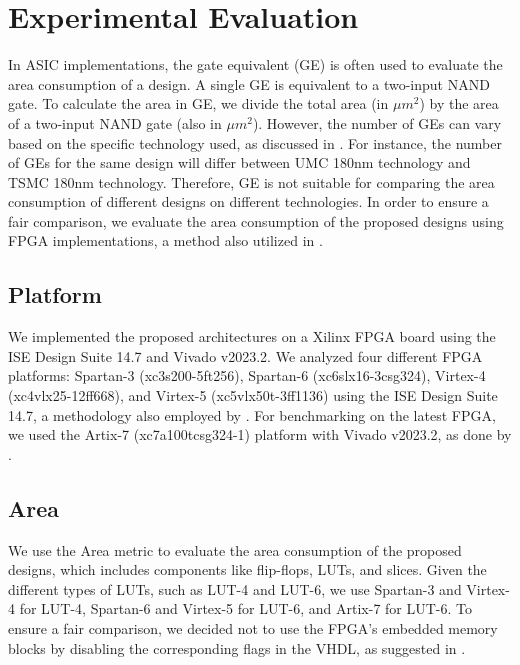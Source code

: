 \documentclass[sn-basic]{sn-jnl}%
\begin{document}
\section{Experimental Evaluation}\label{sec4}

In ASIC implementations, the gate equivalent (GE) is often used to evaluate the area consumption of a design. 
A single GE is equivalent to a two-input NAND gate. 
To calculate the area in GE, we divide the total area (in $\mu m^2$) by the area of a two-input NAND gate (also in $\mu m^2$). 
However, the number of GEs can vary based on the specific technology used, as discussed in \cite{mckay2016report}. 
For instance, the number of GEs for the same design will differ between UMC 180nm technology and TSMC 180nm technology. 
Therefore, GE is not suitable for comparing the area consumption of different designs on different technologies. 
In order to ensure a fair comparison, we evaluate the area consumption of the proposed designs using FPGA implementations, a method also utilized in \cite{mohajerani2020fpga}.

\subsection{Platform}\label{subsec4}

We implemented the proposed architectures on a Xilinx FPGA board using the ISE Design Suite 14.7 and Vivado v2023.2. 
We analyzed four different FPGA platforms: Spartan-3 (xc3s200-5ft256), Spartan-6 (xc6slx16-3csg324), Virtex-4 (xc4vlx25-12ff668), and Virtex-5 (xc5vlx50t-3ff1136) using the ISE Design Suite 14.7, a methodology also employed by \cite{lara2017lightweight}. 
For benchmarking on the latest FPGA, we used the Artix-7 (xc7a100tcsg324-1) platform with Vivado v2023.2, as done by \cite{mohajerani2020fpga}.


\subsection{Area}\label{subsec5}

We use the Area metric to evaluate the area consumption of the proposed designs, which includes components like flip-flops, LUTs, and slices. 
Given the different types of LUTs, such as LUT-4 and LUT-6, we use Spartan-3 and Virtex-4 for LUT-4, Spartan-6 and Virtex-5 for LUT-6, and Artix-7 for LUT-6. 
To ensure a fair comparison, we decided not to use the FPGA's embedded memory blocks by disabling the corresponding flags in the VHDL, as suggested in \cite{xilinx2022ultrafast}.
\end{document}
